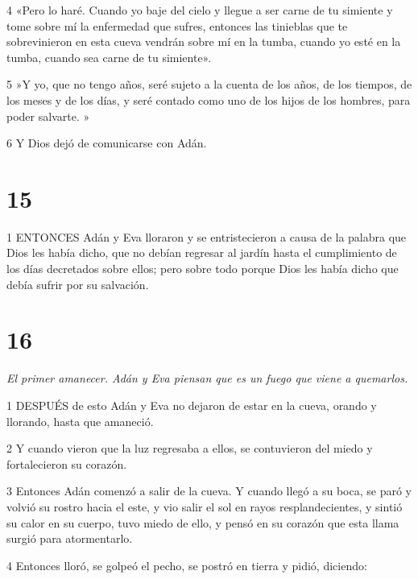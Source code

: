 \par 4 «Pero lo haré. Cuando yo baje del cielo y llegue a ser carne de tu simiente y tome sobre mí la enfermedad que sufres, entonces las tinieblas que te sobrevinieron en esta cueva vendrán sobre mí en la tumba, cuando yo esté en la tumba, cuando sea carne de tu simiente».

\par 5 »Y yo, que no tengo años, seré sujeto a la cuenta de los años, de los tiempos, de los meses y de los días, y seré contado como uno de los hijos de los hombres, para poder salvarte. »

\par 6 Y Dios dejó de comunicarse con Adán.

\chapter{15}

\par 1 ENTONCES Adán y Eva lloraron y se entristecieron a causa de la palabra que Dios les había dicho, que no debían regresar al jardín hasta el cumplimiento de los días decretados sobre ellos; pero sobre todo porque Dios les había dicho que debía sufrir por su salvación.

\chapter{16}

\par \textit{El primer amanecer. Adán y Eva piensan que es un fuego que viene a quemarlos.}

\par 1 DESPUÉS de esto Adán y Eva no dejaron de estar en la cueva, orando y llorando, hasta que amaneció.

\par 2 Y cuando vieron que la luz regresaba a ellos, se contuvieron del miedo y fortalecieron su corazón.

\par 3 Entonces Adán comenzó a salir de la cueva. Y cuando llegó a su boca, se paró y volvió su rostro hacia el este, y vio salir el sol en rayos resplandecientes, y sintió su calor en su cuerpo, tuvo miedo de ello, y pensó en su corazón que esta llama surgió para atormentarlo.

\par 4 Entonces lloró, se golpeó el pecho, se postró en tierra y pidió, diciendo:

